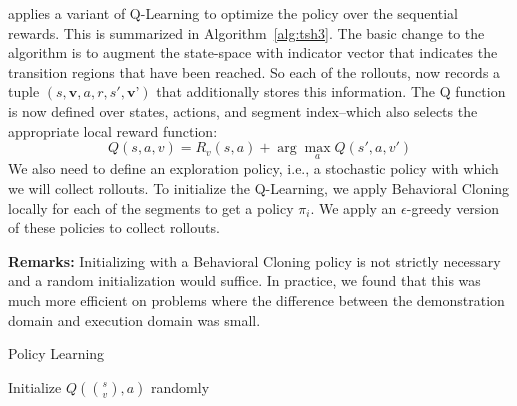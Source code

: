 \hirl applies a variant of Q-Learning to optimize the policy over the sequential rewards. This is summarized in Algorithm~\ref{alg:tsh3}. The basic change to the algorithm is to augment the state-space with indicator vector that indicates the transition regions that have been reached. So each of the rollouts, now records a tuple $(s,\textbf{v},a,r, s', \textbf{v'})$ that additionally stores this information. The Q function is now defined over states, actions, and segment index--which also selects the appropriate local reward function:
\[
Q(s,a,v) = R_v(s,a) + \arg \max_{a} Q(s',a, v')
\]
We also need to define an exploration policy, i.e., a stochastic policy with which we will collect rollouts. To initialize the Q-Learning, we apply Behavioral Cloning locally for each of the segments to get a policy $\pi_i$. We apply an $\epsilon$-greedy version of these policies to collect rollouts.

\vspace{0.5em} \noindent \textbf{Remarks: } Initializing with a Behavioral Cloning policy is not strictly necessary and a random initialization would suffice. In practice, we found that this was much more efficient on problems where the difference between the demonstration domain and execution domain was small.

\begin{phase}[t]
\small
\DontPrintSemicolon
\caption{Policy Learning \label{alg:tsh3}}

Initialize $Q(\binom{s}{v},a)$ randomly


\end{phase}







